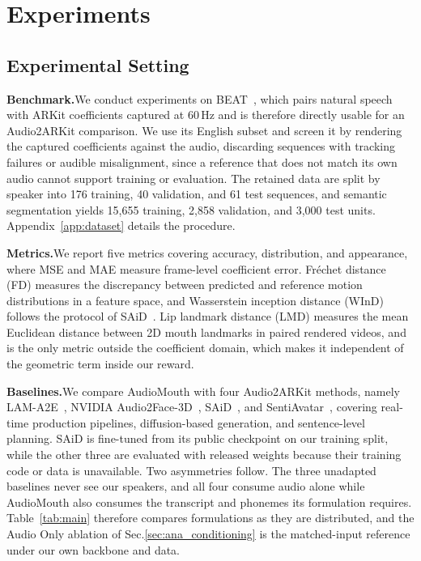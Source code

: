 \section{Experiments}
\label{sec:exp}

\subsection{Experimental Setting}
\label{sec:setting}

\noindent\textbf{Benchmark.}\quad We conduct experiments on BEAT~\citep{liu2022beat}, which pairs natural speech with ARKit coefficients captured at 60\,Hz and is therefore directly usable for an Audio2ARKit comparison. We use its English subset and screen it by rendering the captured coefficients against the audio, discarding sequences with tracking failures or audible misalignment, since a reference that does not match its own audio cannot support training or evaluation. The retained data are split by speaker into 176 training, 40 validation, and 61 test sequences, and semantic segmentation yields 15{,}655 training, 2{,}858 validation, and 3{,}000 test units. Appendix~\ref{app:dataset} details the procedure.

\noindent\textbf{Metrics.}\quad We report five metrics covering accuracy, distribution, and appearance, where MSE and MAE measure frame-level coefficient error. Fr\'echet distance (FD) measures the discrepancy between predicted and reference motion distributions in a feature space, and Wasserstein inception distance (WInD) follows the protocol of SAiD~\citep{park2023said}. Lip landmark distance (LMD) measures the mean Euclidean distance between 2D mouth landmarks in paired rendered videos, and is the only metric outside the coefficient domain, which makes it independent of the geometric term inside our reward.

\noindent\textbf{Baselines.}\quad We compare AudioMouth with four Audio2ARKit methods, namely LAM-A2E~\citep{lam}, NVIDIA Audio2Face-3D~\citep{chung2025audio2face}, SAiD~\citep{park2023said}, and SentiAvatar~\citep{jin2026sentiavatar}, covering real-time production pipelines, diffusion-based generation, and sentence-level planning. SAiD is fine-tuned from its public checkpoint on our training split, while the other three are evaluated with released weights because their training code or data is unavailable. Two asymmetries follow. The three unadapted baselines never see our speakers, and all four consume audio alone while AudioMouth also consumes the transcript and phonemes its formulation requires. Table~\ref{tab:main} therefore compares formulations as they are distributed, and the Audio Only ablation of Sec.\ref{sec:ana_conditioning} is the matched-input reference under our own backbone and data.

